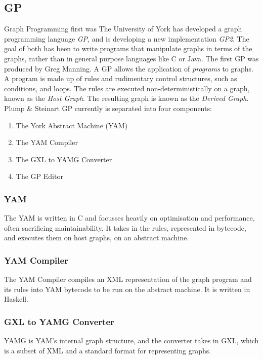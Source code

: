\documentclass{UoYCSproject}
\begin{document}
\subsection{GP}
Graph Programming first was %
The University of York has developed a graph programming language \emph{GP}, and is developing a new implementation \emph{GP2}. The goal of both has been to write programs that manipulate graphs in terms of the graphs, rather than in general purpose languages like C or Java. The first GP was produced by Greg Manning. %
A GP allows the application of \emph{programs} to graphs. A program is made up of rules and rudimentary control structures, such as conditions, and loops. The rules are executed non-deterministically on a graph, known as the \emph{Host Graph}. The resulting graph is known as the \emph{Derived Graph}.
Plump \& Steinart
GP currently is separated into four components:
\begin{enumerate}
  \item The York Abstract Machine (YAM)
  \item The YAM Compiler
  \item The GXL to YAMG Converter
  \item The GP Editor
\end{enumerate}
\subsubsection{YAM}
The YAM is written in C and focusses heavily on optimisation and performance, often sacrificing maintainability. It takes in the rules, represented in bytecode, and executes them on host graphs, on an abstract machine.
\subsubsection{YAM Compiler}
The YAM Compiler compiles an XML representation of the graph program and its rules into YAM bytecode to be run on the abstract machine. It is written in Haskell.
\subsubsection{GXL to YAMG Converter}
YAMG is YAM's internal graph structure, and the converter takes in GXL, which is a subset of XML and a standard format for representing graphs.
\end{document}

